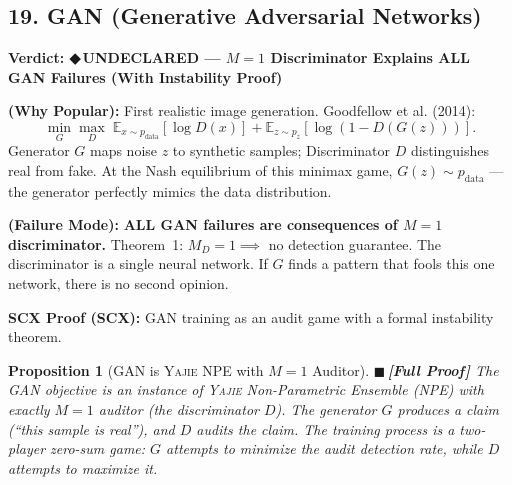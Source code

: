 \documentclass[12pt,a4paper]{article}
\newtheorem{proposition}[theorem]{Proposition}
\theoremstyle{definition}
\newcommand{\rigorFull}{{\color{rigorcolor}$\blacksquare$\,\textbf{[Full Proof]}}}
\newcommand{\guilty}{{\color{guiltycolor}\textbf{◆\,UNDECLARED}}}
\newcommand{\Yajie}{\textsc{Yajie}}
\newcommand{\E}{\mathbb{E}}
\newcommand{\auditHeader}[1]{\medskip\noindent\textbf{\large #1}\medskip}
\newcommand{\whyPopular}{\noindent\textbf{ (Why Popular):} }
\newcommand{\whyFail}{\noindent\textbf{ (Failure Mode):} }
\newcommand{\scxProof}{\noindent\textbf{SCX Proof (SCX):} }
\begin{document}
\subsection{19. GAN (Generative Adversarial Networks) }

\auditHeader{Verdict: \guilty{} — $M=1$ Discriminator Explains ALL GAN Failures (With Instability Proof)}

\whyPopular{} First realistic image generation. Goodfellow et al. (2014):
\[
\min_G \max_D \; \E_{x \sim p_{\text{data}}}[\log D(x)] + \E_{z \sim p_z}[\log(1 - D(G(z)))].
\]
Generator $G$ maps noise $z$ to synthetic samples; Discriminator $D$ distinguishes real from fake. At the Nash equilibrium of this minimax game, $G(z) \sim p_{\text{data}}$ — the generator perfectly mimics the data distribution.

\whyFail{} \textbf{ALL GAN failures are consequences of $M=1$ discriminator.} Theorem~1: $M_D = 1 \implies$ no detection guarantee. The discriminator is a single neural network. If $G$ finds a pattern that fools this one network, there is no second opinion.

\scxProof{} GAN training as an audit game with a formal instability theorem.

\begin{proposition}[GAN is \Yajie{} NPE with $M=1$ Auditor]\label{prop:gan_yajie}
\rigorFull
The GAN objective is an instance of \Yajie{} Non-Parametric Ensemble (NPE) with exactly $M=1$ auditor (the discriminator $D$). The generator $G$ produces a claim (``this sample is real''), and $D$ audits the claim. The training process is a two-player zero-sum game: $G$ attempts to minimize the audit detection rate, while $D$ attempts to maximize it.
\end{proposition}
\end{document}
